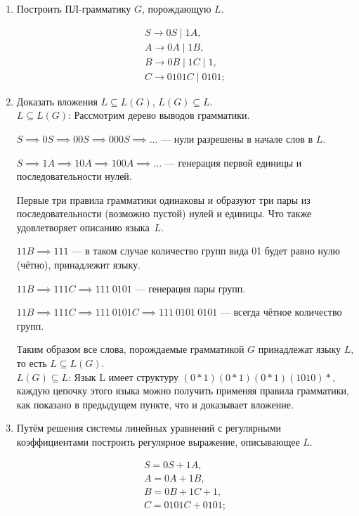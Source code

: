 \documentclass[fleqn,12pt, a4paper]{article}
\begin{document}
\begin{enumerate}[label=(\roman{*})]
	\item Построить ПЛ-грамматику $G$, порождающую $L$.
	
	\begin{equation}
		\begin{array}{l}
			S \to 0S \mid 1A, \\
			A \to 0A \mid 1B, \\
			B \to 0B \mid 1C \mid 1, \\
			C \to 0101C \mid 0101;
		\end{array}
	\end{equation}
	
	\item Доказать вложения $L \subseteq L(G)$, $L(G) \subseteq L$.\\
	
	\underline{$L \subseteq L(G)$}: Рассмотрим дерево выводов грамматики.
	
	$S \implies 0S \implies 00S \implies 000S \implies \dots$ --- нули разрешены в начале слов в $L$.
	
	$S \implies 1A \implies 10A \implies 100A \implies \dots$ --- генерация первой единицы и последовательности нулей.
	
	Первые три правила грамматики одинаковы и образуют три пары из последовательности (возможно пустой) нулей и единицы. Что также удовлетворяет описанию языка~$L$.
	
	$11B \implies 111 $ --- в таком случае количество групп вида 01 будет равно нулю (чётно), принадлежит языку.
	
	$11B \implies 111C \implies 111\ 0101$ --- генерация пары групп.
	
	$11B \implies 111C \implies 111\ 0101C \implies 111\ 0101\ 0101$ --- всегда чётное количество групп.
	
	Таким образом все слова, порождаемые грамматикой $G$ принадлежат языку $L$, то есть $L \subseteq L(G)$.\\
	
	
	\underline{$L(G) \subseteq L$}: Язык L имеет структуру $(0*1)(0*1)(0*1)(1010)*$, каждую цепочку этого языка можно получить применяя правила грамматики, как показано в предыдущем пункте, что и доказывает вложение.
	
	\item Путём решения системы линейных уравнений с регулярными коэффициентами построить регулярное выражение, описывающее $L$.
	
	
	\begin{equation}
		\begin{array}{l}
		S = 0S + 1A, \\
		A = 0A + 1B, \\
		B = 0B + 1C + 1, \\
		C = 0101C + 0101; \\\\
		

\end{array}
\end{equation}
\end{enumerate}
\end{document}
